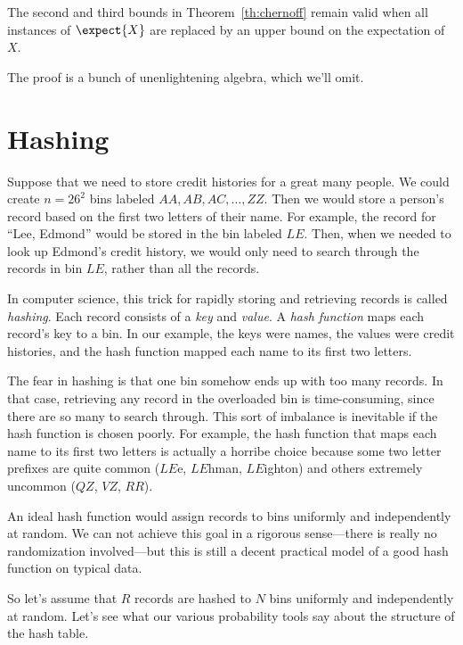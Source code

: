 \begin{editingnotes}
\begin{corollary}
\label{cor:chernoff}
The second and third bounds in Theorem~\ref{th:chernoff} remain valid
when all instances of $\expect{X}$ are replaced by an upper bound on the
expectation of $X$.
\end{corollary}

The proof is a bunch of unenlightening algebra, which we'll omit.

\section{Hashing}

Suppose that we need to store credit histories for a great many
people.  We could create $n = 26^2$ bins labeled $AA, AB, AC, \ldots,
ZZ$.  Then we would store a person's record based on the first two
letters of their name.  For example, the record for ``Lee, Edmond''
would be stored in the bin labeled $LE$.  Then, when we needed to look
up Edmond's credit history, we would only need to search through the
records in bin $LE$, rather than all the records.

In computer science, this trick for rapidly storing and retrieving
records is called \textit{hashing}.  Each record consists of a
\textit{key} and \textit{value}.  A \textit{hash function} maps each
record's key to a bin.  In our example, the keys were names, the
values were credit histories, and the hash function mapped each name
to its first two letters.

The fear in hashing is that one bin somehow ends up with too many
records.  In that case, retrieving any record in the overloaded bin is
time-consuming, since there are so many to search through.  This sort
of imbalance is inevitable if the hash function is chosen poorly.  For
example, the hash function that maps each name to its first two
letters is actually a horribe choice because some two letter prefixes
are quite common ($LE$e, $LE$hman, $LE$ighton) and others extremely
uncommon ($QZ$, $VZ$, $RR$).

An ideal hash function would assign records to bins uniformly and
independently at random.  We can not achieve this goal in a rigorous
sense---there is really no randomization involved---but this is
still a decent practical model of a good hash function on typical
data.

So let's assume that $R$ records are hashed to $N$ bins uniformly and
independently at random.  Let's see what our various probability tools
say about the structure of the hash table.


\end{editingnotes}
